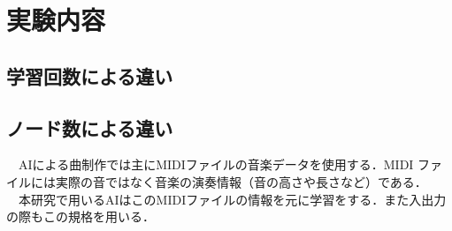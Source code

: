 \chapter{実験内容}
\section{学習回数による違い}

\section{ノード数による違い}

　AIによる曲制作では主にMIDIファイルの音楽データを使用する．MIDI ファイルには実際の音ではなく音楽の演奏情報（音の高さや長さなど）である．\\
　本研究で用いるAIはこのMIDIファイルの情報を元に学習をする．また入出力の際もこの規格を用いる．\\
